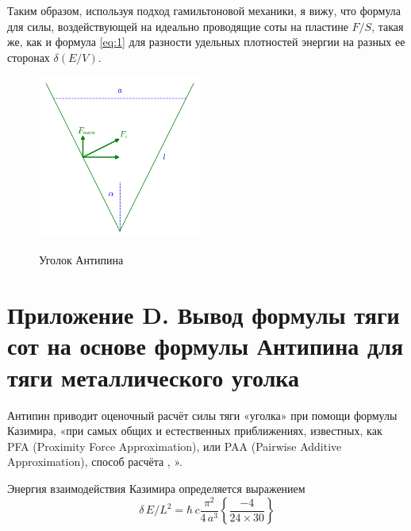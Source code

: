 \documentclass[11pt]{article}
\begin{document}
    Таким образом, используя подход гамильтоновой механики, я вижу, что
формула для силы, воздействующей на идеально проводящие соты на пластине
\({F}/{S}\), такая же, как и формула \ref{eq:1} для разности удельных плотностей энергии на
разных ее сторонах \(\delta\left({E}/{V}\right)\).

    \begin{figure}
\begin{center}
\includegraphics[width=0.48\textwidth]{Antipins_angle_ru.png}
\caption{}{Уголок Антипина}
\end{center}
\label{fig:Antipins_angle}
\end{figure}

    \section{Приложение D. Вывод формулы тяги сот на основе формулы Антипина
для тяги металлического
уголка}\label{ux43fux440ux438ux43bux43eux436ux435ux43dux438ux435-d.-ux432ux44bux432ux43eux434-ux444ux43eux440ux43cux443ux43bux44b-ux442ux44fux433ux438-ux441ux43eux442-ux43dux430-ux43eux441ux43dux43eux432ux435-ux444ux43eux440ux43cux443ux43bux44b-ux430ux43dux442ux438ux43fux438ux43dux430-ux434ux43bux44f-ux442ux44fux433ux438-ux43cux435ux442ux430ux43bux43bux438ux447ux435ux441ux43aux43eux433ux43e-ux443ux433ux43eux43bux43aux430}

    Антипин \cite{Antipin2012} приводит оценочный расчёт силы тяги «уголка»
при помощи формулы Казимира, «при самых общих и естественных
приближениях, известных, как PFA (Proximity Force Approximation), или
PAA (Pairwise Additive Approximation), способ расчёта
\cite{Intravaia2013}, \cite{Rodriguez2011}».

Энергия взаимодействия Казимира определяется выражением
\[\delta\,E/L^2 = \hbar\,c\frac{\pi^2}{4\,a^3}\left\{\frac{-4}{24\times30}\right\}\]
\end{document}
